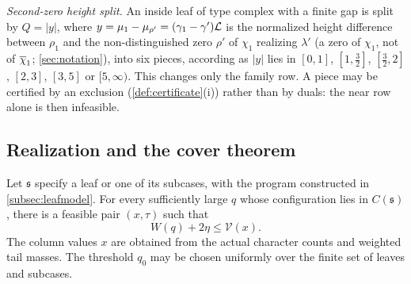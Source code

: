 \emph{Second-zero height split.} An inside leaf of type $\mathrm{complex}$ with a finite gap is
split by $Q=|y|$, where $y=\mu_1-\mu_{\rho'}=(\gamma_1-\gamma')\mathcal{L}$ is the normalized height difference between
$\rho_1$ and the non-distinguished zero $\rho'$ of $\chi_1$ realizing $\lambda'$ (a zero of $\chi_1$, not of $\overline{\chi}_1$;
\cref{sec:notation}), into six pieces, according as $|y|$ lies in $[0,1]$, $[1,\frac32]$, $[\frac32,2]$, $[2,3]$,
$[3,5]$ or $[5,\infty)$. This changes only the family row. A piece may be certified by an exclusion (\cref{def:certificate}(i)) rather than by
duals: the near row alone is then infeasible.

\subsection{Realization and the cover theorem}\label{subsec:realization}

\begin{proposition}[Realization]\label{prop:realization}
Let $\mathfrak s$ specify a leaf or one of its subcases, with the program constructed
in \cref{subsec:leafmodel}. For every sufficiently large $q$ whose configuration lies
in $C(\mathfrak s)$, there is a feasible pair $(x,\tau)$ such that
\[
  W(q)+2\eta\le\mathcal V(x).
\]
The column values $x$ are obtained from the actual character counts and weighted tail
masses. The threshold $q_0$ may be chosen uniformly over the finite set of leaves and
subcases.
\end{proposition}

